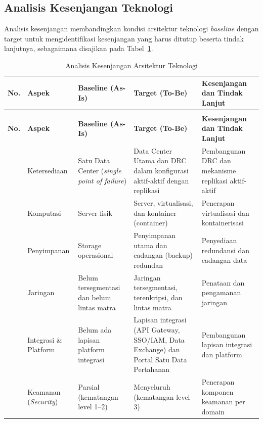 \subsection{Analisis Kesenjangan Teknologi}

Analisis kesenjangan membandingkan kondisi arsitektur teknologi \textit{baseline} dengan target untuk mengidentifikasi kesenjangan yang harus ditutup beserta tindak lanjutnya, sebagaimana disajikan pada Tabel~\ref{tab:d4-25}.

{\small
\begin{longtable}{@{}>{\raggedright\arraybackslash}p{}>{\raggedright\arraybackslash}p{}>{\raggedright\arraybackslash}p{}>{\raggedright\arraybackslash}p{}>{\raggedright\arraybackslash}p{}@{}}
\caption{Analisis Kesenjangan Arsitektur Teknologi}
\label{tab:d4-25}\\
\toprule
\textbf{No.} & \textbf{Aspek} & \textbf{Baseline (As-Is)} & \textbf{Target (To-Be)} & \textbf{Kesenjangan dan Tindak Lanjut}\\
\midrule
\endfirsthead
\multicolumn{5}{@{}l}{\small\itshape \tablename\ \thetable{} (lanjutan)}\\
\toprule
\textbf{No.} & \textbf{Aspek} & \textbf{Baseline (As-Is)} & \textbf{Target (To-Be)} & \textbf{Kesenjangan dan Tindak Lanjut}\\
\midrule
\endhead
\bottomrule
\endlastfoot
1 & Ketersediaan & Satu Data Center (\textit{single point of failure}) & Data Center Utama dan DRC dalam konfigurasi aktif-aktif dengan replikasi & Pembangunan DRC dan mekanisme replikasi aktif-aktif\\
2 & Komputasi & Server fisik & Server, virtualisasi, dan kontainer (container) & Penerapan virtualisasi dan kontainerisasi\\
3 & Penyimpanan & Storage operasional & Penyimpanan utama dan cadangan (backup) redundan & Penyediaan redundansi dan cadangan data\\
4 & Jaringan & Belum tersegmentasi dan belum lintas matra & Jaringan tersegmentasi, terenkripsi, dan lintas matra & Penataan dan pengamanan jaringan\\
5 & Integrasi \& Platform & Belum ada lapisan platform integrasi & Lapisan integrasi (API Gateway, SSO/IAM, Data Exchange) dan Portal Satu Data Pertahanan & Pembangunan lapisan integrasi dan platform\\
6 & Keamanan (\textit{Security}) & Parsial (kematangan level 1–2) & Menyeluruh (kematangan level 3) & Penerapan komponen keamanan per domain\\
\end{longtable}
}

